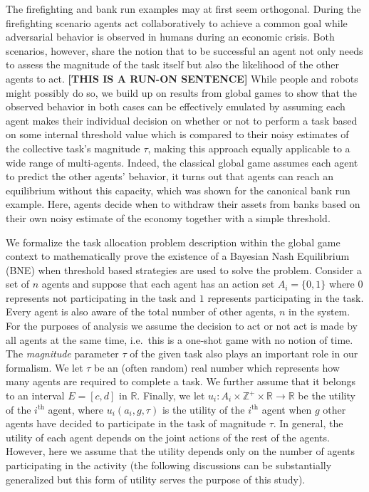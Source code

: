 \documentclass{nature}
\def\Z{\mathbb{Z}}    %
\def\R{\mathbb{R}}    %
\begin{document}
The firefighting and bank run examples may at first seem orthogonal. During the firefighting scenario agents act collaboratively to achieve a common goal while adversarial behavior is observed in humans during an economic crisis. Both scenarios, however, share the notion that to be successful an agent not only needs to assess the magnitude of the task itself but also the likelihood of the other agents to act. \textbf{[THIS IS A RUN-ON SENTENCE]} While people and robots might possibly do so, we build up on results from global games\cite{Carlsson1993} to show that the observed behavior in both cases can be effectively emulated by assuming each agent makes their individual decision on whether or not to perform a task based on some internal threshold value which is compared to their noisy estimates of the collective task's magnitude $\tau$, making this approach equally applicable to a wide range of multi-agents. Indeed, the classical global game assumes each agent to predict the other agents' behavior, it turns out that agents can reach an equilibrium without this capacity, which was shown for the canonical bank run example\cite{Morris2000}. Here, agents decide when to withdraw their assets from banks based on their own noisy estimate of the economy together with a simple threshold.  

We formalize the task allocation problem description within the global game context to mathematically prove the existence of a Bayesian Nash Equilibrium (BNE) when threshold based strategies are used to solve the problem. Consider a set of $n$ agents and suppose that each agent has an action set $A_i=\{0,1\}$ where $0$ represents not participating in the task and $1$ represents participating in the task. Every agent is also aware of the total number of other agents, $n$ in the system. For the purposes of analysis we assume the decision to act or not act is made by all agents at the same time, i.e.\ this is a one-shot game with no notion of time. The \emph{magnitude} parameter $\tau$ of the given task also plays an important role in our formalism. We let $\tau$ be an (often random) real number which represents how many agents are required to complete a task. We further assume that it belongs to an interval $E=[c,d]$ in $\R$.  Finally, we let $u_i:A_i\times\Z^+\times \R\to \R$ be the utility of the $i^{\text{th}}$ agent, where $u_i(a_i,g,\tau)$ is the utility of the $i^{\text{th}}$ agent when $g$ other agents have decided to participate in the task of magnitude $\tau$. In general, the utility of each agent depends on the joint actions of the rest of the agents. However, here we assume that the utility depends only on the number of agents participating in the activity (the following discussions can be substantially generalized but this form of utility serves the purpose of this study). 
\end{document}
